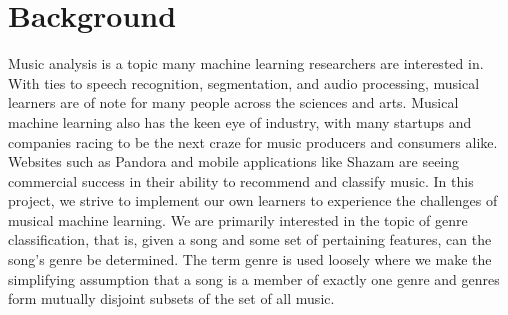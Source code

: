 \documentclass[11pt, twocolumn]{article}
\begin{document}
\section{Background}
    Music analysis is a topic many machine learning researchers are interested in. With ties to speech recognition, segmentation, and audio processing, musical learners are of note for many people across the sciences and arts. Musical machine learning also has the keen eye of industry, with many startups and companies racing to be the next craze for music producers and consumers alike. Websites such as Pandora and mobile applications like Shazam are seeing commercial success in their ability to recommend and classify music. In this project, we strive to implement our own learners to experience the challenges of musical machine learning. We are primarily interested in the topic of genre classification, that is, given a song and some set of pertaining features, can the song’s genre be determined. The term genre is used loosely where we make the simplifying assumption that a song is a member of exactly one genre and genres form mutually disjoint subsets of the set of all music. 
\end{document}
